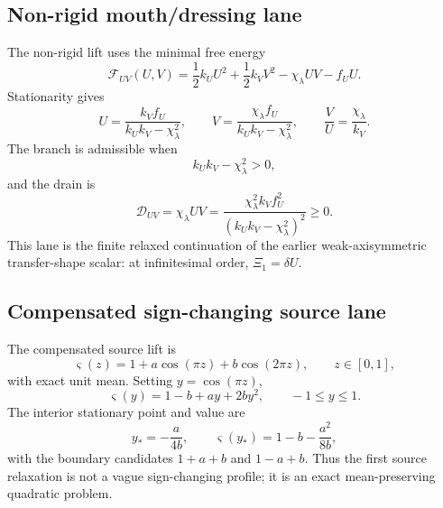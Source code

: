 \subsection{Non-rigid mouth/dressing lane}
\label{subsec:part08-uv-lane}

The non-rigid lift uses the minimal free energy
\begin{equation}
\label{eq:part08-stage243-fuv}
\mathcal F_{UV}(U,V)
=
\frac12k_UU^2+\frac12k_VV^2-\chi_\lambda UV-f_UU.
\end{equation}
Stationarity gives
\begin{equation}
\label{eq:part08-stage243-uv-solution}
U=\frac{k_Vf_U}{k_Uk_V-\chi_\lambda^2},
\qquad
V=\frac{\chi_\lambda f_U}{k_Uk_V-\chi_\lambda^2},
\qquad
\frac{V}{U}=\frac{\chi_\lambda}{k_V}.
\end{equation}
The branch is admissible when
\begin{equation}
\label{eq:part08-stage243-uv-stability}
k_Uk_V-\chi_\lambda^2>0,
\end{equation}
and the drain is
\begin{equation}
\label{eq:part08-stage243-duv}
\mathcal D_{UV}=\chi_\lambda UV
=
\frac{\chi_\lambda^2k_Vf_U^2}{(k_Uk_V-\chi_\lambda^2)^2}\ge0.
\end{equation}
This lane is the finite relaxed continuation of the earlier weak-axisymmetric transfer-shape scalar: at infinitesimal order, \(\Xi_1=\delta U\).

\subsection{Compensated sign-changing source lane}
\label{subsec:part08-compensated-source-lane}

The compensated source lift is
\begin{equation}
\label{eq:part08-stage243-varsigma}
\varsigma(z)=1+a\cos(\pi z)+b\cos(2\pi z),
\qquad
z\in[0,1],
\end{equation}
with exact unit mean.  Setting \(y=\cos(\pi z)\),
\begin{equation}
\label{eq:part08-stage243-varsigma-quadratic}
\varsigma(y)=1-b+ay+2by^2,
\qquad
-1\le y\le 1.
\end{equation}
The interior stationary point and value are
\begin{equation}
\label{eq:part08-stage243-varsigma-min}
y_*=-\frac{a}{4b},
\qquad
\varsigma(y_*)=1-b-\frac{a^2}{8b},
\end{equation}
with the boundary candidates \(1+a+b\) and \(1-a+b\).  Thus the first source relaxation is not a vague sign-changing profile; it is an exact mean-preserving quadratic problem.

